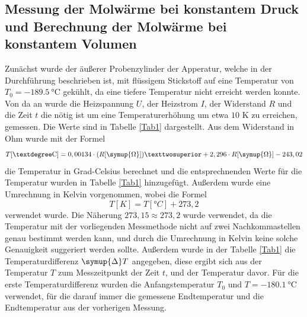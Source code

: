 
\subsection{Messung der Molwärme bei konstantem Druck und Berechnung der Molwärme bei konstantem Volumen}

Zunächst wurde der äußerer Probenzylinder der Apperatur, welche in der Durchführung beschrieben ist, mit 
flüssigem Stickstoff auf eine Temperatur von $T_0 = \SI{-189,5}{\celsius}$ gekühlt, da eine tiefere Temperatur 
nicht erreicht werden konnte. Von da an wurde die Heizspannung $U$, der Heizstrom $I$, der Widerstand $R$ 
und die Zeit $t$ die nötig ist um eine Temperaturerhöhung um etwa $10$ K zu erreichen, gemessen. Die Werte sind in Tabelle \ref{Tab1} 
dargestellt. Aus dem Widerstand in Ohm wurde mit der Formel 
\begin{equation*}
    T[\si{°C}] = 0,00134 \cdot (R[\symup{\Omega}])² + 2,296 \cdot R[\symup{\Omega}] -243,02
\end{equation*}
die Temperatur in Grad-Celsius berechnet und die entsprechnenden Werte für die Temperatur wurden 
in Tabelle \ref{Tab1} hinzugefügt. Außerdem wurde eine Umrechnung in Kelvin vorgenommen, 
wobei die Formel 
\begin{equation*}
    T[\si{K}] = T[\si{°C}] + 273,2
\end{equation*}
verwendet wurde. Die Näherung $273,15 \approx 273,2$ wurde verwendet, da die Temperatur mit der vorliegenden 
Messmethode nicht auf zwei Nachkommastellen genau bestimmt werden kann, und durch die Umrechnung in Kelvin 
keine solche Genauigkeit suggeriert werden sollte. 
Außerdem wurde in der Tabelle \ref{Tab1} die Temperaturdifferenz $\symup{\Delta}T$ angegeben, diese ergibt 
sich aus der Temperatur $T$ zum Messzeitpunkt der Zeit $t$, und der Temperatur davor. Für die erste 
Temperaturdifferenz wurden die Anfangstemperatur $T_0$ und $T=\SI{-180,1}{\celsius}$ verwendet, für die darauf 
immer die gemessene Endtemperatur und die Endtemperatur aus der vorherigen Messung.

